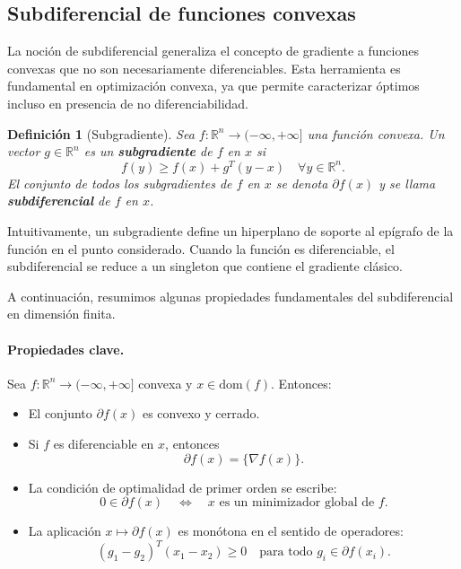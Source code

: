 \documentclass[12pt]{book}
\newtheorem{definition}{Definición}
\theoremstyle{definition}
\theoremstyle{plain}
\theoremstyle{remark}
\begin{document}
\subsection{Subdiferencial de funciones convexas}

La noción de subdiferencial generaliza el concepto de gradiente a funciones convexas que no son necesariamente diferenciables. Esta herramienta es fundamental en optimización convexa, ya que permite caracterizar óptimos incluso en presencia de no diferenciabilidad.

\begin{definition}[Subgradiente]
Sea \( f: \mathbb{R}^n \to (-\infty, +\infty] \) una función convexa. Un vector \( g \in \mathbb{R}^n \) es un \textbf{subgradiente} de \( f \) en \( x \) si
\[
f(y) \geq f(x) + g^T (y - x) \quad \forall y \in \mathbb{R}^n.
\]
El conjunto de todos los subgradientes de \( f \) en \( x \) se denota \( \partial f(x) \) y se llama \textbf{subdiferencial} de \( f \) en \( x \).
\end{definition}

Intuitivamente, un subgradiente define un hiperplano de soporte al epígrafo de la función en el punto considerado. Cuando la función es diferenciable, el subdiferencial se reduce a un singleton que contiene el gradiente clásico.

A continuación, resumimos algunas propiedades fundamentales del subdiferencial en dimensión finita.

\paragraph{Propiedades clave.}
Sea \( f: \mathbb{R}^n \to (-\infty,+\infty] \) convexa y \( x \in \mathrm{dom}(f) \). Entonces:
\begin{itemize}
    \item El conjunto \( \partial f(x) \) es convexo y cerrado.
    \item Si \( f \) es diferenciable en \( x \), entonces
    \[
    \partial f(x) = \{ \nabla f(x) \}.
    \]
    \item La condición de optimalidad de primer orden se escribe:
    \[
    0 \in \partial f(x) \quad \Longleftrightarrow \quad x \text{ es un minimizador global de } f.
    \]
    \item La aplicación \( x \mapsto \partial f(x) \) es monótona en el sentido de operadores:
    \[
    (g_1 - g_2)^T (x_1 - x_2) \geq 0
    \quad \text{para todo } g_i \in \partial f(x_i).
    \]
\end{itemize}
\end{document}
